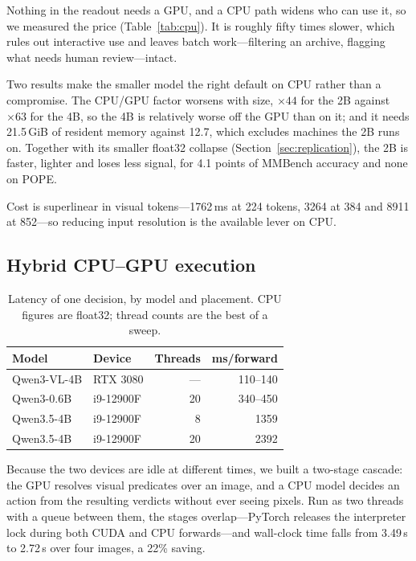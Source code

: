 \documentclass[10pt,twocolumn]{article}
\begin{document}
Nothing in the readout needs a GPU, and a CPU path widens who can use it, so we
measured the price (Table~\ref{tab:cpu}). It is roughly fifty times slower,
which rules out interactive use and leaves batch work---filtering an archive,
flagging what needs human review---intact.

Two results make the smaller model the right default on CPU rather than a
compromise. The CPU/GPU factor worsens with size, $\times 44$ for the 2B
against $\times 63$ for the 4B, so the 4B is relatively worse off the GPU than
on it; and it needs 21.5\,GiB of resident memory against 12.7, which excludes
machines the 2B runs on. Together with its smaller float32 collapse
(Section~\ref{sec:replication}), the 2B is faster, lighter and loses less
signal, for 4.1 points of MMBench accuracy and none on POPE.

Cost is superlinear in visual tokens---1762\,ms at 224 tokens, 3264 at 384 and
8911 at 852---so reducing input resolution is the available lever on CPU.

\subsection{Hybrid CPU--GPU execution}
\label{sec:cascade}

\begin{table}[t]
\centering\small
\caption{Latency of one decision, by model and placement. CPU figures are
float32; thread counts are the best of a sweep.}
\label{tab:latency}
\begin{tabular}{llrr}
\toprule
Model & Device & Threads & ms/forward \\
\midrule
Qwen3-VL-4B  & RTX 3080 & --- & 110--140 \\
Qwen3-0.6B   & i9-12900F & 20 & 340--450 \\
Qwen3.5-4B   & i9-12900F & 8  & 1359 \\
Qwen3.5-4B   & i9-12900F & 20 & 2392 \\
\bottomrule
\end{tabular}
\end{table}

Because the two devices are idle at different times, we built a two-stage
cascade: the GPU resolves visual predicates over an image, and a CPU model
decides an action from the resulting verdicts without ever seeing pixels. Run
as two threads with a queue between them, the stages overlap---PyTorch releases
the interpreter lock during both CUDA and CPU forwards---and wall-clock time
falls from 3.49\,s to 2.72\,s over four images, a 22\% saving.
\end{document}
